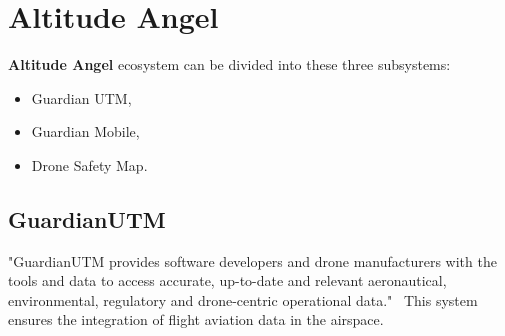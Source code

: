 \section{Altitude Angel}\label{sec:altitude-angel}
\textbf{Altitude Angel} ecosystem can be divided into these three subsystems:
\begin{itemize}
    \item Guardian UTM,
    \item Guardian Mobile,
    \item Drone Safety Map.
\end{itemize}

\subsection{GuardianUTM}\label{subsec:guardianutm}
"GuardianUTM provides software developers and drone manufacturers with the tools and data to access accurate, up-to-date and relevant aeronautical, environmental, regulatory and drone-centric operational data."~\cite{altitudeAngel}
This system ensures the integration of flight aviation data in the airspace.


